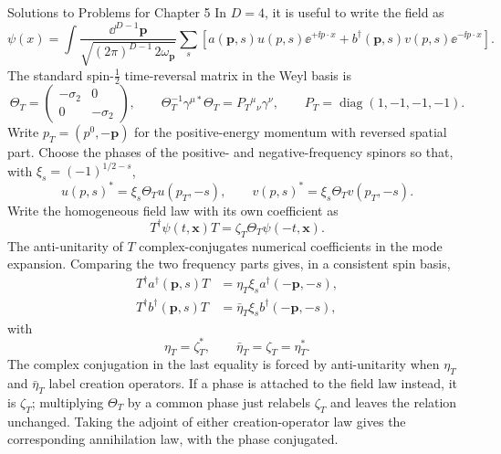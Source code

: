 \begin{bankssolutions}{Solutions to Problems for Chapter 5}
In $D=4$, it is useful to write the field as
\begin{equation*}
 \psi(x)=\int\frac{\dd^{D-1}\mathbf p}{\sqrt{(2\pi)^{D-1}\,2\omega_{\mathbf p}}}
 \sum_s\left[a(\mathbf p,s)u(p,s)\ee^{+\ii p\cdot x}
 +b^\dagger(\mathbf p,s)v(p,s)\ee^{-\ii p\cdot x}\right].
\end{equation*}
The standard spin-$\frac12$ time-reversal matrix in the Weyl basis is
\begin{equation*}
 \Theta_T=\begin{pmatrix}-\sigma_2&0\\0&-\sigma_2\end{pmatrix},
 \qquad
 \Theta_T^{-1}\gamma^{\mu *}\Theta_T
 =P_T{}^\mu{}_{\nu}\gamma^\nu,
 \qquad P_T=\operatorname{diag}(1,-1,-1,-1).
\end{equation*}
Write $p_T=(p^0,-\mathbf p)$ for the positive-energy momentum with reversed
spatial part. Choose the phases of the positive- and negative-frequency spinors so that,
with $\xi_s=(-1)^{1/2-s}$,
\begin{equation*}
 u(p,s)^*=\xi_s\Theta_Tu(p_T,-s),
 \qquad
 v(p,s)^*=\xi_s\Theta_Tv(p_T,-s).
\end{equation*}
Write the homogeneous field law with its own coefficient as
\begin{equation*}
 T^\dagger\psi(t,\mathbf x)T
 =\zeta_T\Theta_T\psi(-t,\mathbf x).
\end{equation*}
The anti-unitarity of $T$ complex-conjugates numerical coefficients in the mode
expansion. Comparing the two frequency parts gives, in a consistent spin basis,
\begin{align*}
 T^\dagger a^\dagger(\mathbf p,s)T&=\eta_T\xi_sa^\dagger(-\mathbf p,-s),\\
 T^\dagger b^\dagger(\mathbf p,s)T&=\bar\eta_T\xi_sb^\dagger(-\mathbf p,-s),
\end{align*}
with
\begin{equation*}
 \eta_T=\zeta_T^*,
 \qquad
 \bar\eta_T=\zeta_T=\eta_T^*.
\end{equation*}
The complex conjugation in the last equality is forced by anti-unitarity when
$\eta_T$ and $\bar\eta_T$ label creation operators. If a phase is attached to
the field law instead, it is $\zeta_T$; multiplying $\Theta_T$ by a common phase
just relabels $\zeta_T$ and leaves the relation unchanged. Taking the adjoint
of either creation-operator law gives the corresponding annihilation law, with
the phase conjugated.


\end{bankssolutions}
